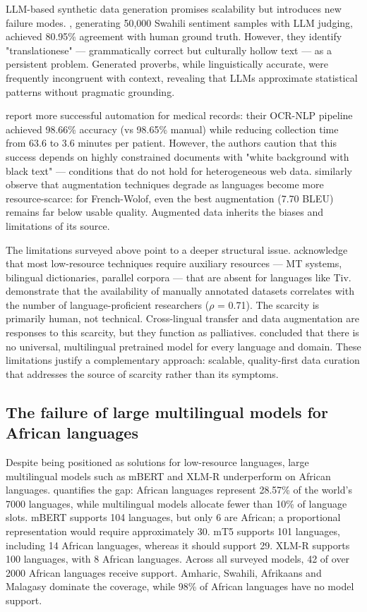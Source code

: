 \documentclass[11pt,a4paper]{article}
\begin{document}
LLM-based synthetic data generation promises scalability but introduces new failure modes. \citet{gyamfi2026synthetic}, generating 50,000 Swahili sentiment samples with LLM judging, achieved 80.95\% agreement with human ground truth. However, they identify "translationese" — grammatically correct but culturally hollow text — as a persistent problem. Generated proverbs, while linguistically accurate, were frequently incongruent with context, revealing that LLMs approximate statistical patterns without pragmatic grounding.

\citet{Zhou2024} report more successful automation for medical records: their OCR-NLP pipeline achieved 98.66\% accuracy (vs 98.65\% manual) while reducing collection time from 63.6 to 3.6 minutes per patient. However, the authors caution that this success depends on highly constrained documents with "white background with black text" — conditions that do not hold for heterogeneous web data.\citet{oduwole2025scarcity} similarly observe that augmentation techniques degrade as languages become more resource-scarce: for French-Wolof, even the best augmentation (7.70 BLEU) remains far below usable quality. Augmented data inherits the biases and limitations of its source.

The limitations surveyed above point to a deeper structural issue. \citet{hedderich2021survey} acknowledge that most low-resource techniques require auxiliary resources — MT systems, bilingual dictionaries, parallel corpora — that are absent for languages like Tiv. \citet{yu2022beyond} demonstrate that the availability of manually annotated datasets correlates with the number of language-proficient researchers ($\rho$ = 0.71). The scarcity is primarily human, not technical. Cross-lingual transfer and data augmentation are responses to this scarcity, but they function as palliatives. \citet{garcia2025cross} concluded that there is no universal, multilingual pretrained model for every language and domain. These limitations justify a complementary approach: scalable, quality-first data curation that addresses the source of scarcity rather than its symptoms.

\subsection{The failure of large multilingual models for African languages}

Despite being positioned as solutions for low-resource languages, large multilingual models such as mBERT and XLM-R underperform on African languages. \citet{hussen2025state} quantifies the gap: African languages represent 28.57\% of the world's 7000 languages, while multilingual models allocate fewer than 10\% of language slots. mBERT supports 104 languages, but only 6 are African; a proportional representation would require approximately 30. mT5 supports 101 languages, including 14 African languages, whereas it should support 29. XLM-R supports 100 languages, with 8 African languages. Across all surveyed models, 42 of over 2000 African languages receive support. Amharic, Swahili, Afrikaans and Malagasy dominate the coverage, while 98\% of African languages have no model support.
\end{document}
